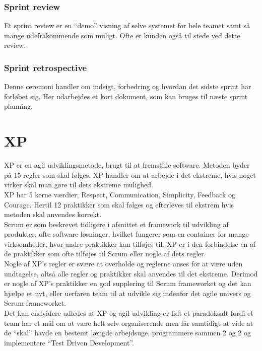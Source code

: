 \subsubsection{Sprint review}
Et sprint review er en “demo” visning af selve systemet for hele teamet samt så mange udefrakommende som muligt. Ofte er kunden også til stede ved dette review.

\subsubsection{Sprint retrospective}
Denne ceremoni handler om indsigt, forbedring og hvordan det sidste sprint har forløbet sig. Her udarbejdes et kort dokument, som kan bruges til næste sprint planning.

\section{XP}\label{sec:xp}
XP er en agil udviklingsmetode, brugt til at fremstille software. Metoden byder på 15 regler som skal følges. XP handler om at arbejde i det ekstreme, 
hvis noget virker skal man gøre til dets ekstreme mulighed.  \\

XP har 5 kerne værdier; Respect, Communication, Simplicity, Feedback og Courage. Hertil 12 praktikker som 
skal følges og efterleves til ekstrem hvis metoden skal anvendes korrekt. \\

Scrum er som beskrevet tidligere i afsnittet et framework til udvikling af produkter, ofte software løsninger, 
hvilket fungerer som en container for mange virksomheder, hvor andre praktikker kan tilføjes til. XP er i den 
forbindelse en af de praktikker som ofte tilføjes til Scrum eller nogle af dets regler. \\

Nogle af XP’s regler er svære at overholde og reglerne anses for at være uden undtagelse, altså alle regler 
og praktikker skal anvendes til det ekstreme. Derimod er nogle af XP’s praktikker en god supplering til 
Scrum frameworket og det kan hjælpe et nyt, eller uerfaren team til at udvikle sig indenfor det agile 
univers og Scrum frameworket. \\

Det kan endvidere udledes at XP og agil udvikling er lidt et paradoksalt fordi et team har et mål om at være helt selv organiserende men får 
samtidigt at vide at de “skal” havde en bestemt længde arbejdsuge, programmere sammen 2 og 2 og implementere “Test Driven Development”. 


